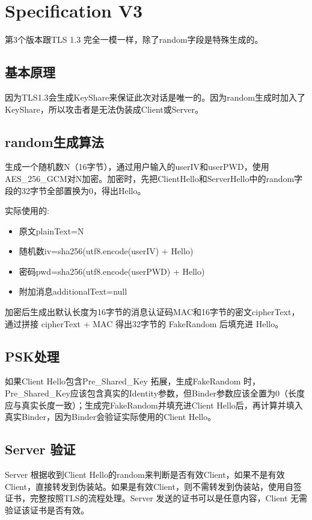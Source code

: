 \chapter{Specification V3}
第3个版本跟TLS 1.3 完全一模一样，除了random字段是特殊生成的。

\section{基本原理}
因为TLS1.3会生成KeyShare来保证此次对话是唯一的。因为random生成时加入了KeyShare，所以攻击者是无法伪装成Client或Server。

\section{random生成算法}
生成一个随机数N（16字节），通过用户输入的userIV和userPWD，使用AES\_256\_GCM对N加密。加密时，先把ClientHello和ServerHello中的random字段的32字节全部置换为0，得出Hello。

实际使用的:
\begin{itemize}
	\item 原文plainText=N
	\item 随机数iv=sha256(utf8.encode(userIV) + Hello)
	\item 密码pwd=sha256(utf8.encode(userPWD) + Hello)
	\item 附加消息additionalText=null
\end{itemize}

加密后生成出默认长度为16字节的消息认证码MAC和16字节的密文cipherText，通过拼接 cipherText + MAC 得出32字节的 FakeRandom 后填充进 Hello。

\section{PSK处理}
如果Client Hello包含Pre\_Shared\_Key 拓展，生成FakeRandom 时，Pre\_Shared\_Key应该包含真实的Identity参数，但Binder参数应该全置为0（长度应与真实长度一致）；生成完FakeRandom并填充进Client Hello后，再计算并填入真实Binder，因为Binder会验证实际使用的Client Hello。

\section{Server 验证}
Server 根据收到Client Hello的random来判断是否有效Client，如果不是有效Client，直接转发到伪装站。如果是有效Client，则不需转发到伪装站，使用自签证书，完整按照TLS的流程处理。Server 发送的证书可以是任意内容，Client 无需验证该证书是否有效。

